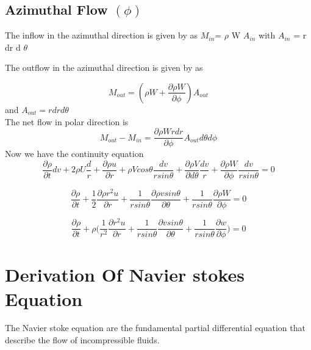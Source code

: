 \documentclass[a4paper, 12pt]{report}
\begin{document}
\subsection{ Azimuthal Flow $(\phi)$}

The inflow in the azimuthal direction is given by as\newline
$ M_{in} $= $\rho$ W $A_{in}$ \newline
 with  $A_{in}$ = r dr d $\theta$
 
 The outflow in the azimuthal direction is given by as\newline
 
\begin{equation*}
	M_{out}=(\rho W+\frac{\partial \rho W}{\partial \phi})A_{out}
\end{equation*}
and $A_{out}=rdrd\theta$\\
The net flow in polar direction is 
\begin{equation*}
	M_{out}-M_{in}=\frac{\partial \rho Wrdr}{\partial \phi}A_{out}d\theta d\phi
\end{equation*}
Now we have the continuity equation \newline
\begin{equation*}
	\frac{\partial \rho}{\partial t}dv+2\rho U\frac{d}{r}+\frac{\partial \rho u}{\partial r}+\rho Vcos\theta\frac{dv}{rsin\theta}+\frac{\partial \rho V}{\partial d\theta}\frac{dv}{r}+\frac{\partial \rho W}{\partial \phi}\frac{dv}{rsin\theta}=0
\end{equation*}

\begin{equation*}
	\frac{\partial \rho}{\partial t}+\frac{1}{2}\frac{\partial \rho r^2u}{\partial r}+\frac{1}{rsin\theta}\frac{\partial \rho vsin\theta}{\partial \theta}+\frac{1}{rsin\theta}\frac{\partial \rho W}{\partial \phi}=0
\end{equation*}


\begin{equation*}
	\frac{\partial \rho}{\partial t}+\rho \bigg(\frac{1}{r^2}\frac{\partial r^2u}{\partial r}+\frac{1}{rsin\theta}\frac{\partial vsin\theta}{\partial \theta}+\frac{1}{rsin\theta}\frac{\partial w}{\partial \phi}\bigg)=0
\end{equation*}

\newpage
\section{Derivation Of Navier stokes Equation}
The Navier stoke equation are the fundamental partial differential equation that describe the flow of incompressible fluids.
\end{document}
